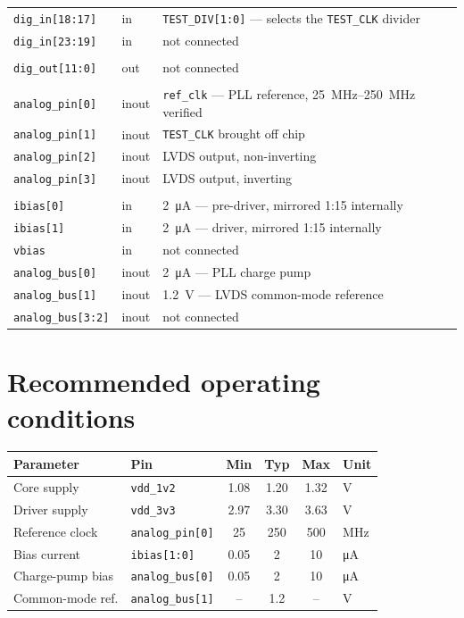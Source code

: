 \documentclass[a4paper,10pt]{article}
\newcommand{\net}[1]{\texttt{#1}}
\begin{document}
\begin{longtable}{@{}l l L{86mm}@{}}
\net{dig\_in[18:17]}& in    & \net{TEST\_DIV[1:0]} --- selects the \net{TEST\_CLK} divider \\
\net{dig\_in[23:19]}& in    & not connected \\
\addlinespace
{}\\
\net{dig\_out[11:0]}& out   & not connected \\
\addlinespace
{}\\
\net{analog\_pin[0]}& inout & \net{ref\_clk} --- PLL reference, \SIrange{25}{250}{\mega\hertz} verified \\
\net{analog\_pin[1]}& inout & \net{TEST\_CLK} brought off chip \\
\net{analog\_pin[2]}& inout & LVDS output, non-inverting \\
\net{analog\_pin[3]}& inout & LVDS output, inverting \\
\addlinespace
{}\\
\net{ibias[0]}      & in    & \SI{2}{\micro\ampere} --- pre-driver, mirrored 1:15 internally \\
\net{ibias[1]}      & in    & \SI{2}{\micro\ampere} --- driver, mirrored 1:15 internally \\
\net{vbias}         & in    & not connected \\
\net{analog\_bus[0]}& inout & \SI{2}{\micro\ampere} --- PLL charge pump \\
\net{analog\_bus[1]}& inout & \SI{1.2}{\volt} --- LVDS common-mode reference \\
\net{analog\_bus[3:2]}& inout & not connected \\
\bottomrule
\end{longtable}

\section{Recommended operating conditions}

\begin{center}
\begin{tabular}{@{}l l S S S l@{}}
\toprule
\textbf{Parameter} & \textbf{Pin} & {\textbf{Min}} & {\textbf{Typ}} & {\textbf{Max}} & \textbf{Unit} \\
\midrule
Core supply        & \net{vdd\_1v2}     & 1.08 & 1.20 & 1.32 & V \\
Driver supply      & \net{vdd\_3v3}     & 2.97 & 3.30 & 3.63 & V \\
Reference clock    & \net{analog\_pin[0]} & 25 & 250 & 500 & MHz \\
Bias current       & \net{ibias[1:0]}   & 0.05 & 2    & 10   & \si{\micro\ampere} \\
Charge-pump bias   & \net{analog\_bus[0]} & 0.05 & 2  & 10   & \si{\micro\ampere} \\
Common-mode ref.   & \net{analog\_bus[1]} & {--} & 1.2 & {--} & V \\
\bottomrule
\end{tabular}
\end{center}
\end{document}
